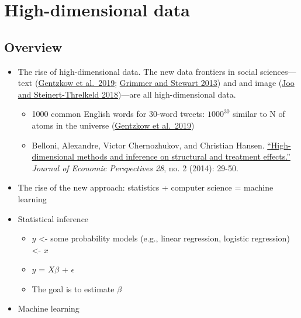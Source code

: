 \documentclass[
]{book}
\begin{document}
\hypertarget{machine_learning}{%
\chapter{High-dimensional data}\label{machine_learning}}

\hypertarget{overview}{%
\section{Overview}\label{overview}}

\begin{itemize}
\item
  The rise of high-dimensional data. The new data frontiers in social sciences---text (\href{https://web.stanford.edu/~gentzkow/research/text-as-data.pdf}{Gentzkow et al.~2019}; \href{https://www.jstor.org/stable/pdf/24572662.pdf?casa_token=SQdSI4R_VdwAAAAA:4QiVLhCXqr9f0qNMM9U75EL5JbDxxnXxUxyIfDf0U8ZzQx9szc0xVqaU6DXG4nHyZiNkvcwGlgD6H0Lxj3y0ULHwgkf1MZt8-9TPVtkEH9I4AHgbTg}{Grimmer and Stewart 2013}) and and image (\href{https://arxiv.org/pdf/1810.01544}{Joo and Steinert-Threlkeld 2018})---are all high-dimensional data.

  \begin{itemize}
  \item
    1000 common English words for 30-word tweets: \(1000^{30}\) similar to N of atoms in the universe (\href{https://web.stanford.edu/~gentzkow/research/text-as-data.pdf}{Gentzkow et al.~2019})
  \item
    Belloni, Alexandre, Victor Chernozhukov, and Christian Hansen. \href{https://pubs.aeaweb.org/doi/pdfplus/10.1257/jep.28.2.29}{``High-dimensional methods and inference on structural and treatment effects.''} \emph{Journal of Economic Perspectives 28}, no. 2 (2014): 29-50.
  \end{itemize}
\item
  The rise of the new approach: statistics + computer science = machine learning
\item
  Statistical inference

  \begin{itemize}
  \item
    \(y\) \textless- some probability models (e.g., linear regression, logistic regression) \textless- \(x\)
  \item
    \(y\) = \(X\beta\) + \(\epsilon\)
  \item
    The goal is to estimate \(\beta\)
  \end{itemize}
\item
  Machine learning


\end{itemize}
\end{document}
